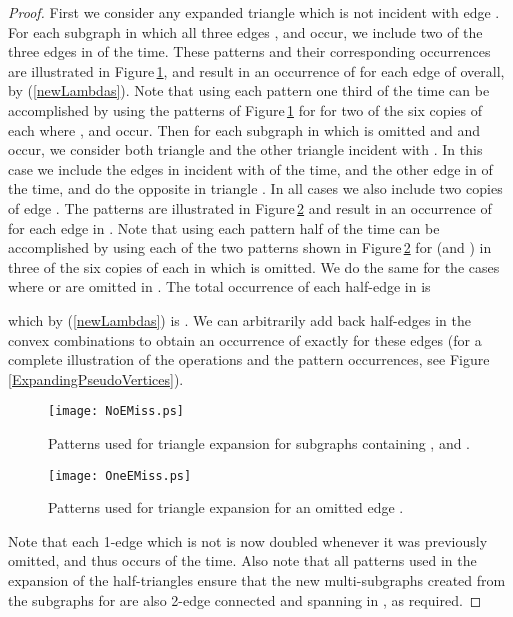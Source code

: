 \documentclass[oneeqnum,final]{siamltex1213}
\begin{document}
\begin{proof}
First we consider any expanded triangle  which is not incident with edge . For each subgraph  in which all three edges ,  and  occur, we include two of the three edges in   of the time. These patterns and their corresponding occurrences are illustrated in Figure\,\ref{ExpandingPseudoVerticesNoEdgeMissing}, and result in an occurrence of  for each edge of  overall, by (\ref{newLambdas}). Note that using each pattern one third of the time can be accomplished by using the patterns of Figure\,\ref{ExpandingPseudoVerticesNoEdgeMissing} for  for two of the six copies of each  where ,  and  occur. Then for each subgraph  in which  is omitted and  and  occur, we consider both triangle  and  the other triangle  incident with . In this case we include the edges in  incident with   of the time, and the other edge in   of the time, and do the opposite in triangle . In all cases we also include two copies of edge . The patterns are illustrated in Figure\,\ref{ExpandingPseudoVerticesOneEdgeMissing} and result in an occurrence of  for each edge in . Note that using each pattern half of the time can be accomplished by using each of the two patterns shown in Figure\,\ref{ExpandingPseudoVerticesOneEdgeMissing} for  (and ) in three of the six copies of each  in which  is omitted. We do the same for the cases where  or  are omitted in . The total occurrence of each half-edge in  is 

which by (\ref{newLambdas}) is . We can arbitrarily add back half-edges in the convex combinations to obtain an occurrence of exactly  for these edges (for a complete illustration of the operations and the pattern occurrences, see Figure\,\ref{ExpandingPseudoVertices}).

\begin{figure}
\begin{center}
\texttt{[image: NoEMiss.ps]}
\end{center}
\caption{Patterns used for triangle expansion for subgraphs containing ,  and .}
\label{ExpandingPseudoVerticesNoEdgeMissing}
\end{figure}

\begin{figure}
\begin{center}
\texttt{[image: OneEMiss.ps]}
\end{center}
\caption{Patterns used for triangle expansion for an omitted edge .}
\label{ExpandingPseudoVerticesOneEdgeMissing}
\end{figure}

Note that each 1-edge which is not  is now doubled whenever it was previously omitted, and thus occurs  of the time. Also note that all patterns used in the expansion of the half-triangles ensure that the new multi-subgraphs created from the subgraphs  for  are also 2-edge connected and spanning in , as required. 


\end{proof}
\end{document}
